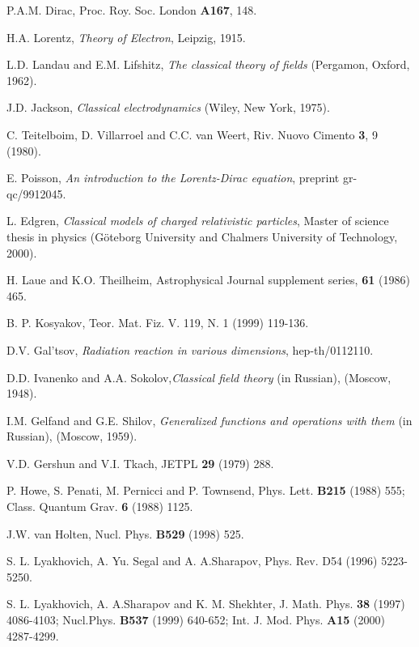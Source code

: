 \documentclass[a4paper,12pt]{article}
\begin{document}
\begin{thebibliography}{99}
  P.A.M. Dirac, Proc. Roy. Soc. London {\bf A167}, 148.

  H.A. Lorentz, {\it Theory of Electron}, Leipzig, 1915.

  L.D. Landau and E.M. Lifshitz,
{\it The classical theory of fields} (Pergamon, Oxford, 1962).

  J.D. Jackson, {\it Classical electrodynamics} (Wiley, New
York, 1975).

  C. Teitelboim, D. Villarroel and C.C. van Weert, Riv. Nuovo
Cimento {\bf 3}, 9 (1980).

  E. Poisson, {\it An introduction to the Lorentz-Dirac
equation}, preprint gr-qc/9912045.

  L. Edgren, {\it Classical models of charged relativistic
particles}, Master of science thesis in physics (G\"oteborg University and
Chalmers University of Technology, 2000).

  H. Laue and K.O. Theilheim, Astrophysical Journal supplement
series, {\bf 61} (1986) 465.

  B. P. Kosyakov, Teor. Mat. Fiz. V. 119, N. 1 (1999) 119-136.

  D.V. Gal'tsov, {\it Radiation reaction in various
dimensions}, hep-th/0112110.

  D.D. Ivanenko and A.A. Sokolov,{\it Classical field theory}
(in Russian), (Moscow, 1948).

  I.M. Gelfand and G.E. Shilov, {\it Generalized functions and
operations with them }(in Russian), (Moscow, 1959).

  V.D. Gershun and V.I. Tkach, JETPL {\bf 29} (1979) 288.

  P. Howe, S. Penati, M. Pernicci and P. Townsend, Phys. Lett.
{\bf B215} (1988) 555; Class. Quantum Grav. {\bf 6} (1988) 1125.

  J.W. van Holten, Nucl. Phys. {\bf B529} (1998) 525.

  S. L. Lyakhovich, A. Yu. Segal and A. A.Sharapov, Phys. Rev.
D54 (1996) 5223-5250.

  S. L. Lyakhovich, A. A.Sharapov and K. M. Shekhter, J.
Math. Phys. {\bf 38} (1997) 4086-4103; Nucl.Phys. {\bf B537} (1999) 640-652;
Int. J. Mod. Phys. {\bf A15} (2000) 4287-4299.
\end{thebibliography}
\end{document}
